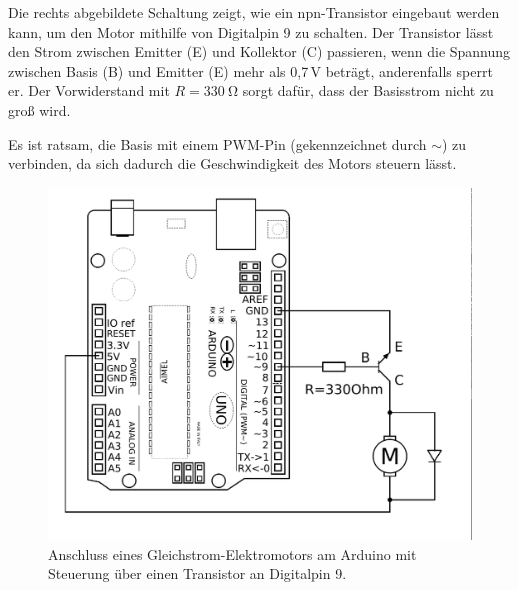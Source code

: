 \medskip
\begin{minipage}{0.48\textwidth}
	Die rechts abgebildete Schaltung zeigt, wie ein npn-Transistor eingebaut werden kann, um den Motor mithilfe von Digitalpin 9 zu schalten. Der Transistor lässt den Strom zwischen Emitter (E) und Kollektor (C) passieren, wenn die Spannung zwischen Basis (B) und Emitter (E) mehr als 0,7\,V beträgt, anderenfalls sperrt er. Der Vorwiderstand mit $R=\SI{330}{\ohm}$ sorgt dafür, dass der Basisstrom nicht zu groß wird.
	
	Es ist ratsam, die Basis mit einem PWM-Pin (gekennzeichnet durch $\sim$) zu verbinden, da sich dadurch die Geschwindigkeit des Motors steuern lässt.
\end{minipage}
\hfill
\begin{minipage}{0.48\textwidth}
	\begin{figure}[H]
		\centering
		\includegraphics[width=\textwidth]{./Zeichnungen/motoranschluss-mit-steuerung.png}
		\caption{Anschluss eines Gleichstrom-Elektromotors am Arduino mit Steuerung über einen Transistor an Digitalpin 9.}
	\end{figure}
\end{minipage}

